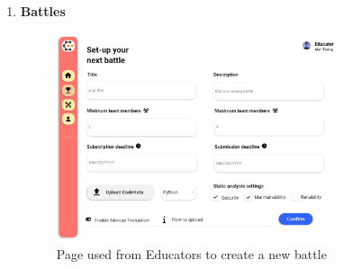 \begin{enumerate}[label=\textbf{F\arabic*)}]
    \item \textbf{Battles}\\
    \begin{figure}[H]
        \centering
        \includegraphics[width=0.8\textwidth]{Mockups/10_educator_create_battle.png}
        \caption{Page used from Educators to create a new battle}
    \end{figure}
    

\end{enumerate}
